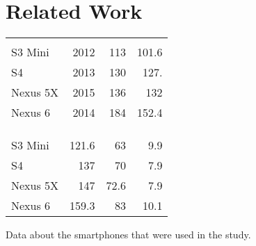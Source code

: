 \section{Related Work}
\label{sec:relw}
\begin{margintable}
	\vspace{-1.3cm}
	\centering
	\begin{tabularx}{1.03\marginparwidth}{Xd{2.1}d{2.1}d{3.1}}
		\toprule
		&
		&    
		 &
		 \\
		\\
		\\
		\midrule
		S3 Mini  		& 2012 & 113  & 101.6\\
		S4 				& 2013 & 130  & 127.\\
		Nexus 5X 		& 2015 & 136  & 132\\
		Nexus 6 		& 2014 & 184  & 152.4\\ 
		
		
		\bottomrule
		
		& &
		 &
		 \\ 
		\\
		\\
		\midrule
		S3 Mini  		& 121.6 & 63  & 9.9 \\
		S4 				& 137  & 70  & 7.9 \\
		Nexus 5X 		& 147  & 72.6 & 7.9 \\
		Nexus 6 		& 159.3 & 83  & 10.1 \\
		
		\bottomrule
	\end{tabularx}%
	\caption[Smartphone data]{\small Data about the smartphones that were used in the study.}
	\label{tab:devices}
\end{margintable}

